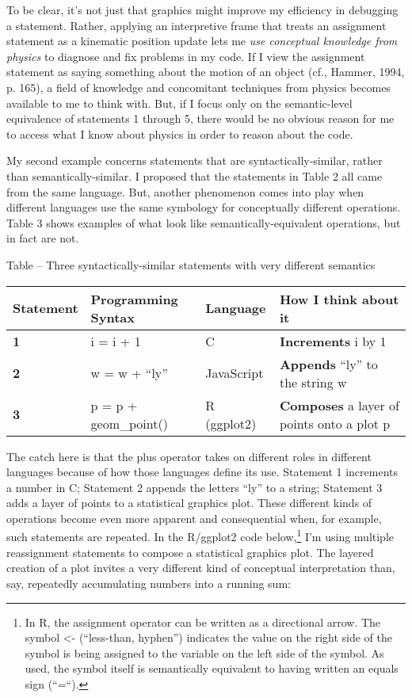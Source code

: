 To be clear, it's not just that graphics might improve my efficiency in
debugging a statement. Rather, applying an interpretive frame that
treats an assignment statement as a kinematic position update lets me
\emph{use conceptual knowledge from physics} to diagnose and fix
problems in my code. If I view the assignment statement as saying
something about the motion of an object (cf., Hammer, 1994, p. 165), a
field of knowledge and concomitant techniques from physics becomes
available to me to think with. But, if I focus only on the
semantic-level equivalence of statements 1 through 5, there would be no
obvious reason for me to access what I know about physics in order to
reason about the code.

My second example concerns statements that are syntactically-similar,
rather than semantically-similar. I proposed that the statements in
Table 2 all came from the same language. But, another phenomenon comes
into play when different languages use the same symbology for
conceptually different operations. Table 3 shows examples of what look
like semantically-equivalent operations, but in fact are not.

\protect\hypertarget{ux5fToc252445957}{}{}Table -- Three
syntactically-similar statements with very different semantics

\begin{longtable}[]{@{}llll@{}}
\toprule
\textbf{Statement } & Programming Syntax & Language & How I think about
it\tabularnewline
\midrule
\endhead
\textbf{1} & i = i + 1 & C & \textbf{Increments} i by 1\tabularnewline
\textbf{2} & w = w + ``ly'' & JavaScript & \textbf{Appends} ``ly'' to
the string w\tabularnewline
\textbf{3} & p = p + geom\_point() & R (ggplot2) & \textbf{Composes} a
layer of points onto a plot p\tabularnewline
\bottomrule
\end{longtable}

The catch here is that the plus operator takes on different roles in
different languages because of how those languages define its use.
Statement 1 increments a number in C; Statement 2 appends the letters
``ly'' to a string; Statement 3 adds a layer of points to a statistical
graphics plot. These different kinds of operations become even more
apparent and consequential when, for example, such statements are
repeated. In the R/ggplot2 code below,\footnote{In R, the assignment
  operator can be written as a directional arrow. The symbol
  \textless{}- (``less-than, hyphen'') indicates the value on the right
  side of the symbol is being assigned to the variable on the left side
  of the symbol. As used, the symbol itself is semantically equivalent
  to having written an equals sign (``=``).} I'm using multiple
reassignment statements to compose a statistical graphics plot. The
layered creation of a plot invites a very different kind of conceptual
interpretation than, say, repeatedly accumulating numbers into a running
sum:

